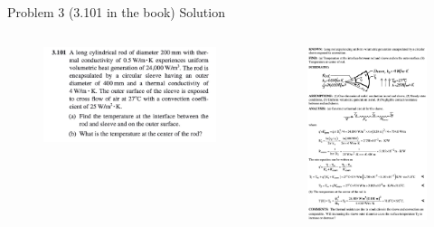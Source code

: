 \documentclass[9pt, aspectratio=169, handout]{beamer}
\begin{document}
\begin{frame}{Problem 3 (3.101 in the book) Solution}
    \begin{columns}
        \begin{figure}
            \centering
            \includegraphics[width=\textwidth]{Figures/fig1.3.jpg}
        \end{figure}
        \begin{figure}
            \centering
            \includegraphics[width=.7\textwidth]{Figures/fig1.3_solution.jpg}
        \end{figure}
    \end{columns}
\end{frame}
\end{document}
